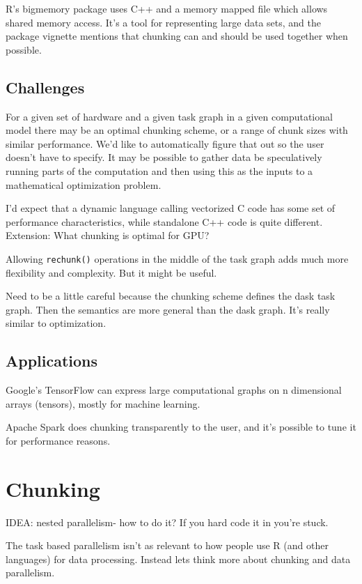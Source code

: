 \documentclass[12pt]{article}
\begin{document}
R's bigmemory package uses C++ and a memory mapped file which allows shared
memory access. \cite{kane2010bigmemory} It's a tool for representing large
data sets, and the package vignette mentions that chunking can and should
be used together when possible.

\subsection{Challenges}

For a given set of hardware and a given task graph in a given
computational model there may be
an optimal chunking scheme, or a range of chunk sizes with similar performance.
We'd like to automatically figure that out so the user doesn't have to
specify. It may be possible to gather data be speculatively running parts
of the computation and then using this as the inputs to a 
mathematical optimization problem.

I'd expect that a dynamic language calling vectorized C code has some set
of performance characteristics, while standalone C++ code is quite
different.
Extension: What chunking is optimal for GPU?

Allowing \texttt{rechunk()} operations in the middle of the task graph adds
much more flexibility and complexity. But it might be useful.

Need to be a little careful because the chunking scheme defines the dask
task graph. Then the semantics are more general than the dask graph. It's
really similar to optimization.

\subsection{Applications}

Google's TensorFlow can express large computational graphs on n dimensional
arrays (tensors), mostly for machine learning.

Apache Spark does chunking transparently to the user, and it's possible to
tune it for performance reasons.


\section{Chunking}

IDEA: nested parallelism- how to do it? If you hard code it in you're
stuck.

The task based parallelism isn't as relevant to how people use R (and other
languages) for data processing. Instead
lets think more about chunking and data parallelism. 
\end{document}
